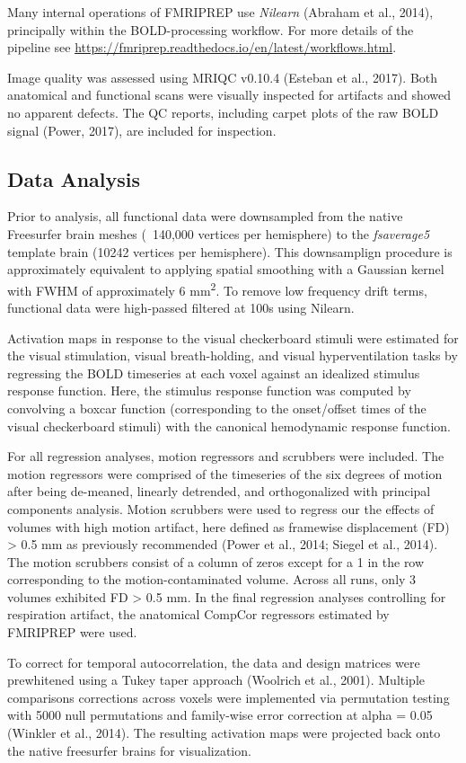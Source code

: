 \documentclass[9pt]{NEU502b-fmri}
\begin{document}
Many internal operations of FMRIPREP use \textit{Nilearn} (Abraham et al., 2014), principally within the BOLD-processing workflow. For more details of the pipeline see \href{https://fmriprep.readthedocs.io/en/latest/workflows.html}{https://fmriprep.readthedocs.io/en/latest/workflows.html}.

Image quality was assessed using MRIQC v0.10.4 (Esteban et al., 2017). Both anatomical and functional scans were visually inspected for artifacts and showed no apparent defects. The QC reports, including carpet plots of the raw BOLD signal (Power, 2017), are included for  inspection.

\subsection{Data Analysis}
Prior to analysis, all functional data were downsampled from the native Freesurfer brain meshes (~140,000 vertices per hemisphere) to the \textit{fsaverage5} template brain (10242 vertices per hemisphere). This downsamplign procedure is approximately equivalent to applying spatial smoothing with a Gaussian kernel with FWHM of approximately 6 mm\textsuperscript{2}. To remove low frequency drift terms, functional data were high-passed filtered at 100s using Nilearn.

Activation maps in response to the visual checkerboard stimuli were estimated for the visual stimulation, visual breath-holding, and visual hyperventilation tasks by regressing the BOLD timeseries at each voxel against an idealized stimulus response function. Here, the stimulus response function was computed by convolving a boxcar function (corresponding to the onset/offset times of the visual checkerboard stimuli) with the canonical hemodynamic response function. 

For all regression analyses, motion regressors and scrubbers were included. The motion regressors were comprised of the timeseries of the six degrees of motion after being de-meaned, linearly detrended, and orthogonalized with principal components analysis. Motion scrubbers were used to regress our the effects of volumes with high motion artifact, here defined as framewise displacement (FD) > 0.5 mm as previously recommended (Power et al., 2014; Siegel et al., 2014). The motion scrubbers consist of a column of zeros except for a 1 in the row corresponding to the motion-contaminated volume. Across all runs, only 3 volumes exhibited FD > 0.5 mm. In the final regression analyses controlling for respiration artifact, the anatomical CompCor regressors estimated by FMRIPREP were used.

To correct for temporal autocorrelation, the data and design matrices were prewhitened using a Tukey taper approach (Woolrich et al., 2001). Multiple comparisons corrections across voxels were implemented via permutation testing with 5000 null permutations and family-wise error correction at alpha = 0.05 (Winkler et al., 2014). The resulting activation maps were projected back onto the native freesurfer brains for visualization. 

\nocite{*} %

\end{document}
